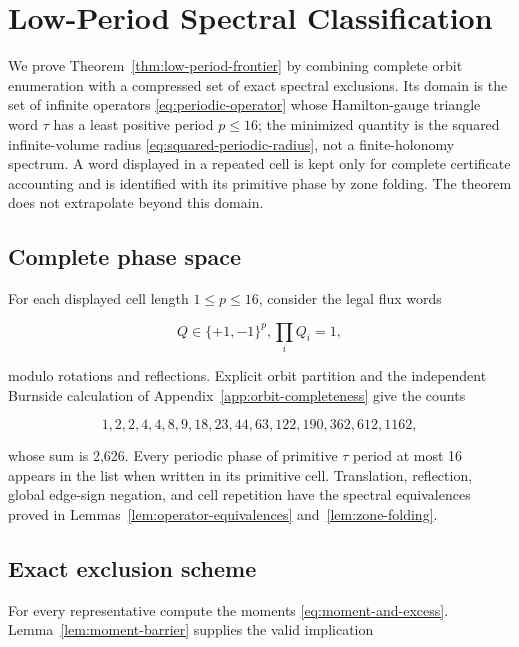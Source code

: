 \section{Low-Period Spectral Classification}\label{sec:low-period-frontier}

We prove Theorem~\ref{thm:low-period-frontier} by combining complete orbit enumeration with a compressed
set of exact spectral exclusions. Its domain is the set of infinite operators
\eqref{eq:periodic-operator} whose Hamilton-gauge triangle word \(\tau\) has a least positive period
\(p\leq 16\); the minimized quantity is the squared infinite-volume radius \eqref{eq:squared-periodic-radius},
not a finite-holonomy spectrum. A word displayed in a repeated cell is kept
only for complete certificate accounting and is identified with its primitive
phase by zone folding. The theorem does not extrapolate beyond this domain.

\subsection{Complete phase space}

For each displayed cell length \(1\leq p\leq 16\), consider the legal flux words

\begin{equation}
\label{eq:legal-periodic-flux}
Q \in \{+1,-1\}^p,       \prod_i Q_i=1,
\end{equation}

modulo rotations and reflections. Explicit orbit partition and the independent
Burnside calculation of Appendix~\ref{app:orbit-completeness} give the counts

\begin{equation}
\label{eq:low-period-orbit-counts}
1,2,2,4,4,8,9,18,23,44,63,122,190,362,612,1162,
\end{equation}

whose sum is 2,626. Every periodic phase of primitive \(\tau\) period at most 16
appears in the list when written in its primitive cell. Translation,
reflection, global edge-sign negation, and cell repetition have the spectral
equivalences proved in Lemmas~\ref{lem:operator-equivalences}
and~\ref{lem:zone-folding}.

\subsection{Exact exclusion scheme}

For every representative compute the moments \eqref{eq:moment-and-excess}. Lemma~\ref{lem:moment-barrier} supplies the
valid implication

